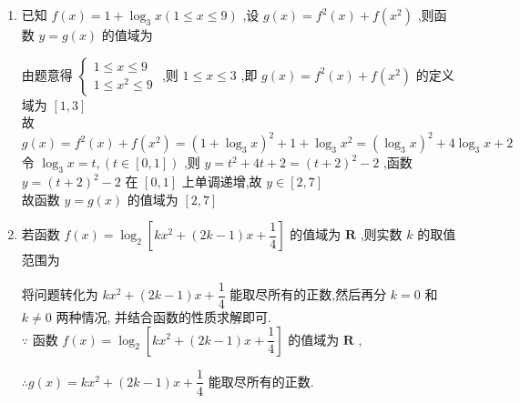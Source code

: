 \begin{enumerate}
\begin{enumerate}
\begin{jieda}
        已知 $y = {\log }_{\frac{1}{2}}t$ 单调递减,所以 $y \geq  {\log }_{\frac{1}{2}}8 =  - 3$ ,
        
        则 $f\left( x\right)$ 的值域为 $\lbrack  - 3, + \infty )$ .
    \end{jieda}
    \item 已知 $f\left( x\right)  = 1 + {\log }_{3}x\left( {1 \leq  x \leq  9}\right)$ ,设 $g\left( x\right)  = {f}^{2}\left( x\right)  + f\left( {x}^{2}\right)$ ,则函数 $y = g\left( x\right)$ 的值域为\blkda{$[2, 7]$}
    \begin{jieda}
        由题意得 $\left\{  \begin{matrix} 1 \leq  x \leq  9 \\  1 \leq  {x}^{2} \leq  9 \end{matrix}\right.$ ,则 $1 \leq  x \leq  3$ ,即 $g\left( x\right)  = {f}^{2}\left( x\right)  + f\left( {x}^{2}\right)$ 的定义域为 $\left\lbrack  {1,3}\right\rbrack$ \\
        故 $g\left( x\right)  = {f}^{2}\left( x\right)  + f\left( {x}^{2}\right)  = {\left( 1 + {\log }_{3}x\right) }^{2} + 1 + {\log }_{3}{x}^{2} = {\left( {\log }_{3}x\right) }^{2} + 4{\log }_{3}x + 2$ \\
        令 ${\log }_{3}x = t,\left( {t \in  \left\lbrack  {0,1}\right\rbrack  }\right)$ ,则 $y = {t}^{2} + {4t} + 2 = {\left( t + 2\right) }^{2} - 2$ ,函数 $y = {\left( t + 2\right) }^{2} - 2$ 在 $\left\lbrack  {0,1}\right\rbrack$ 上单调递增,故 $y \in  \left\lbrack  {2,7}\right\rbrack$ \\
        故函数 $y = g\left( x\right)$ 的值域为 $\left\lbrack  {2,7}\right\rbrack$
    \end{jieda}
    \item 若函数 $f\left( x\right)  = {\log }_{2}\left\lbrack  {k{x}^{2} + \left( {{2k} - 1}\right) x + \dfrac{1}{4}}\right\rbrack$ 的值域为 $\mathbf{R}$ ,则实数 $k$ 的取值范围为
    \begin{jieda}
        将问题转化为 $k{x}^{2} + \left( {{2k} - 1}\right) x + \dfrac{1}{4}$ 能取尽所有的正数,然后再分 $k = 0$ 和 $k \neq  0$ 两种情况, 并结合函数的性质求解即可. \\
        
        $\because$ 函数 $f\left( x\right)  = {\log }_{2}\left\lbrack  {k{x}^{2} + \left( {{2k} - 1}\right) x + \dfrac{1}{4}}\right\rbrack$ 的值域为 $\mathbf{R}$ ,

        $\therefore g\left( x\right)  = k{x}^{2} + \left( {{2k} - 1}\right) x + \dfrac{1}{4}$ 能取尽所有的正数.


\end{jieda}
\end{enumerate}
\end{enumerate}
